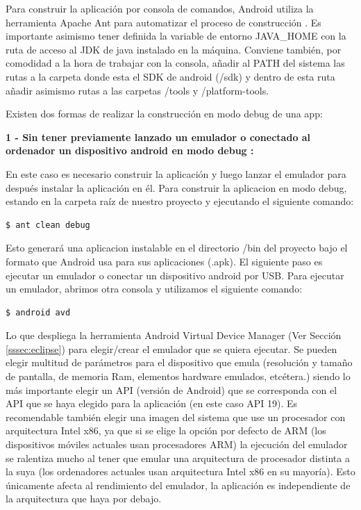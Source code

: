 		Para construir la aplicación por consola de comandos, Android utiliza la herramienta Apache Ant \cite{ref:ant} para automatizar el proceso de construcción \cite{ref:android_cmd_line}. Es importante asimismo tener definida la variable de entorno JAVA\_HOME con la ruta de acceso al JDK de java instalado en la máquina. Conviene también, por comodidad a la hora de trabajar con la consola, añadir al PATH del sistema las rutas a la carpeta donde esta el SDK de android (/sdk) y dentro de esta ruta añadir asimismo rutas a las carpetas /tools y /platform-tools. 

Existen dos formas de realizar la construcción en modo debug de una app:  

\textbf{1 - Sin tener previamente lanzado un emulador o conectado al ordenador un dispositivo android en modo debug \cite{ref:android_device_setUp}:} 
 
 	 En este caso es necesario construir la aplicación y luego lanzar el emulador para después instalar la aplicación en él. Para construir la aplicacion en modo debug,  estando en la carpeta raíz de nuestro proyecto y ejecutando el siguiente comando: 

 	 \begin{lstlisting}[style=console, numbers=none]
		$ ant clean debug
	 \end{lstlisting}
 	 
 	 Esto generará una aplicacion instalable en el directorio /bin del proyecto bajo el formato que Android usa para sus aplicaciones (.apk). El siguiente paso es ejecutar un emulador o conectar un dispositivo android por USB. Para ejecutar un emulador, abrimos otra consola y utilizamos el siguiente comando:
 	 
 	 \begin{lstlisting}[style=console, numbers=none]
		$ android avd
	 \end{lstlisting}
 	 
 	 Lo que despliega la herramienta Android Virtual Device Manager (Ver Sección \ref{sssec:eclipse}) para elegir/crear el emulador que se quiera ejecutar. Se pueden elegir multitud de parámetros \cite{ref:android_avd_params} para el dispositivo que emula (resolución y tamaño de pantalla, de memoria Ram, elementos hardware emulados, etcétera.) siendo lo más importante elegir un API (versión de Android) que se corresponda con el API que se haya elegido para la aplicación (en este caso API 19). Es recomendable también elegir una imagen del sistema que use un procesador con arquitectura Intel x86, ya que si se elige la opción por defecto de ARM (los dispositivos móviles actuales usan procesadores ARM) la ejecución del emulador se ralentiza mucho al tener que emular una arquitectura de procesador distinta a la suya (los ordenadores actuales usan arquitectura Intel x86 en su mayoría). Esto únicamente afecta al rendimiento del emulador, la aplicación es independiente de la arquitectura que haya por debajo. \\[.2cm]
 

